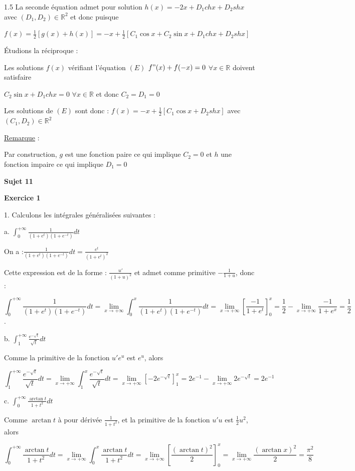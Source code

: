 \documentclass[12pt]{article}
\begin{document}
\begin{spacing}{1.5}
La seconde équation admet pour solution $h(x) =-2x + D_1chx + D_2shx$ avec $(D_1,D_2 )\in\mathbb{R}^2$ et donc puisque

$f(x) =\frac{1}{2}[g(x) +h(x)]=-x +\frac{1}{2}[C_1 \cos x + C_2 \sin x + D_1chx + D_2shx]$

Étudions la réciproque :

Les solutions $f(x)$ vérifiant l'équation $(E)$ 
$f"(x) + f(-x) = 0$ $\forall x\in \mathbb{R}$ doivent satisfaire
 
$C_2\sin x + D_1chx = 0$  $\forall x\in \mathbb{R}$ et donc $C_2 = D_1 = 0$

Les solutions de $(E)$ sont donc : $f(x) =-x+\frac{1}{2}[C_1\cos x + D_2shx]$ avec $(C_1,D_2)\in\mathbb{R}^2$

\medskip\underline{Remarque} :

Par construction, $g$ est une fonction paire ce qui implique $C_2 = 0$ et $h$ une fonction impaire ce
qui implique $D_1 =0$ 




\medskip\textbf{Sujet 11}

\textbf{Exercice 1}

1. Calculons les intégrales généralisées suivantes :

a. $\int_{0}^{+\infty}\frac{1}{(1+e^t)(1+e^{-t})}dt$

On a :$\frac{1}{(1+e^t)(1+e^{-t})}dt=\frac{e^t}{(1+e^t)^2}$

Cette expression est de la forme : $\frac{u'}{(1+u)^2}$ et admet comme primitive $-\frac{1}{1+u}$, donc :

\[\int_{0}^{+\infty}\frac{1}{(1+e^t)(1+e^{-t})}dt=\lim_{x\to +\infty}\int_{0}^{x}\frac{1}{(1+e^t)(1+e^{-t})}dt=\lim_{x\to +\infty}[\frac{-1}{1+e^t}]_0^x=\frac{1}{2}-\lim_{x\to +\infty}\frac{-1}{1+e^x}=\frac{1}{2}\].

b. $\int_{1}^{+\infty}\frac{e^{-\sqrt{t}}}{\sqrt{t}}dt$

Comme la primitive de la fonction $u'e^u$ est $e^u$, alors

\[\int_{1}^{+\infty}\frac{e^{-\sqrt{t}}}{\sqrt{t}}dt=\lim_{x\to +\infty}\int_{1}^{x}\frac{e^{-\sqrt{t}}}{\sqrt{t}}dt=\lim_{x\to +\infty}[-2e^{-\sqrt{t}}]_1^x=2e^{-1}-\lim_{x\to +\infty}2e^{-\sqrt{t}}=2e^{-1}\]

c. $\int_{0}^{+\infty}\frac{\arctan t}{1+t^2}dt$

Comme $\arctan t$ à pour dérivée $\frac{1}{1+t^2}$, et la primitive de la fonction $u'u$ est $\frac{1}{2}u^2$, alors 

\[\int_{0}^{+\infty}\frac{\arctan t}{1+t^2}dt=\lim_{x\to +\infty}\int_{0}^{x}\frac{\arctan t}{1+t^2}dt=\lim_{x\to +\infty}\left[\frac{(\arctan t)^2}{2}\right]_0^x=\lim_{x\to +\infty}\frac{(\arctan x)^2}{2}=\frac{\pi^2}{8}\]


\end{spacing}
\end{document}

